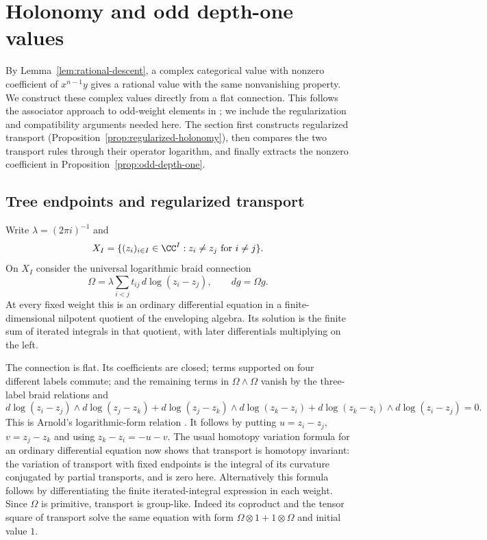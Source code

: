 \section{Holonomy and odd depth-one values}\label{sec:holonomy}

By Lemma~\ref{lem:rational-descent}, a complex categorical value with
nonzero coefficient of $x^{n-1}y$ gives a rational value with the same
nonvanishing property.  We construct these complex values directly
from a flat connection.
This follows the associator approach to odd-weight elements in
\cite[Proposition~6.3]{Drinfeld}; we include the regularization and
compatibility arguments needed here.  The section first constructs
regularized transport (Proposition~\ref{prop:regularized-holonomy}),
then compares the two transport rules through their operator logarithm,
and finally extracts the nonzero coefficient in
Proposition~\ref{prop:odd-depth-one}.

\subsection{Tree endpoints and regularized transport}
Write $\lambda=(2\pi i)^{-1}$ and
\[
 X_I=\{(z_i)_{i\in I}\in\CC^I:z_i\ne z_j\text{ for }i\ne j\}.
\]
On $X_I$ consider the universal logarithmic braid connection
\cite[Section~1.3]{Kohno}
\begin{equation}\label{eq:holonomy-connection}
 \Omega=\lambda\sum_{i<j}t_{ij}\,d\log(z_i-z_j),
 \qquad dg=\Omega g.
\end{equation}
At every fixed weight this is an ordinary differential equation in a
finite-dimensional nilpotent quotient of the enveloping algebra.
Its solution is the finite sum of iterated integrals in that quotient,
with later differentials multiplying on the left.

The connection is flat.  Its coefficients are closed; terms supported
on four different labels commute; and the remaining terms in
$\Omega\wedge\Omega$ vanish by the three-label braid relations and
\[
 d\log(z_i-z_j)\wedge d\log(z_j-z_k)
 +d\log(z_j-z_k)\wedge d\log(z_k-z_i)
 +d\log(z_k-z_i)\wedge d\log(z_i-z_j)=0.
\]
This is Arnold's logarithmic-form relation \cite{Arnold}.
It follows by putting $u=z_i-z_j$, $v=z_j-z_k$ and using
$z_k-z_i=-u-v$.  The usual homotopy variation formula for an ordinary
differential equation now shows that transport is homotopy invariant:
the variation of transport with fixed endpoints is the integral of
its curvature conjugated by partial transports, and is zero here.
Alternatively this formula follows by differentiating the finite
iterated-integral expression in each weight.
Since $\Omega$ is primitive, transport is group-like.  Indeed its
coproduct and the tensor square of transport solve the same equation
with form $\Omega\otimes1+1\otimes\Omega$ and initial value $1$.

